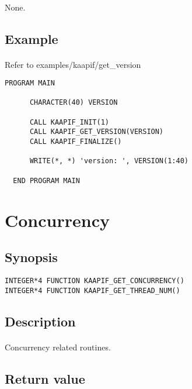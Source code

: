 \documentclass[a4paper, 11pt]{article}
\begin{document}
\paragraph{}
None.

\subsection{Example}
\paragraph{}
Refer to examples/kaapif/get_version\\
\begin{small}
\begin{lstlisting}[frame=tb]
   PROGRAM MAIN

      CHARACTER(40) VERSION

      CALL KAAPIF_INIT(1)
      CALL KAAPIF_GET_VERSION(VERSION)
      CALL KAAPIF_FINALIZE()

      WRITE(*, *) 'version: ', VERSION(1:40)

  END PROGRAM MAIN
\end{lstlisting}
\end{small}


\newpage
\section{Concurrency}

\subsection{Synopsis}
\begin{small}
\lstset{language=C}
\begin{lstlisting}[frame=tb]
INTEGER*4 FUNCTION KAAPIF_GET_CONCURRENCY()
INTEGER*4 FUNCTION KAAPIF_GET_THREAD_NUM()
\end{lstlisting}
\end{small}

\subsection{Description}
\paragraph{}
Concurrency related routines.

\subsection{Return value}
\end{document}

